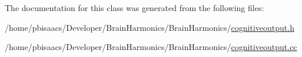 The documentation for this class was generated from the following files\+:\begin{DoxyCompactItemize}
\item 
/home/pbisaacs/\+Developer/\+Brain\+Harmonics/\+Brain\+Harmonics/\mbox{\hyperlink{cognitiveoutput_8h}{cognitiveoutput.\+h}}\item 
/home/pbisaacs/\+Developer/\+Brain\+Harmonics/\+Brain\+Harmonics/\mbox{\hyperlink{cognitiveoutput_8cc}{cognitiveoutput.\+cc}}\end{DoxyCompactItemize}
